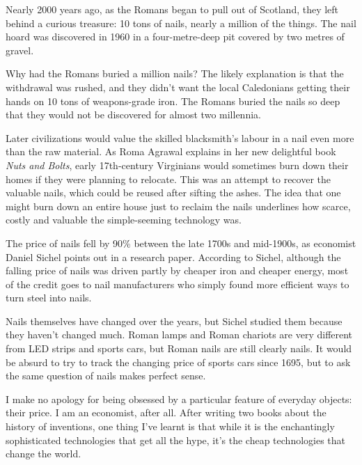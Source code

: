 \documentclass[12pt,a4paper]{article}
\begin{document}
\begin{reading}

\begin{examtext}
Nearly 2000 years ago, as the Romans began to pull out of Scotland, they left behind a curious treasure: 10 tons of nails, nearly a million of the things. The nail hoard was discovered in 1960 in a four-metre-deep pit covered by two metres of gravel.

Why had the Romans buried a million nails? The likely explanation is that the withdrawal was rushed, and they didn't want the local Caledonians getting their hands on 10 tons of weapons-grade iron. The Romans buried the nails so deep that they would not be discovered for almost two millennia.

Later civilizations would value the skilled blacksmith's labour in a nail even more than the raw material. As Roma Agrawal explains in her new delightful book \textit{Nuts and Bolts}, early 17th-century Virginians would sometimes burn down their homes if they were planning to relocate. This was an attempt to recover the valuable nails, which could be reused after sifting the ashes. The idea that one might burn down an entire house just to reclaim the nails underlines how scarce, costly and valuable the simple-seeming technology was.

The price of nails fell by 90\% between the late 1700s and mid-1900s, as economist Daniel Sichel points out in a research paper. According to Sichel, although the falling price of nails was driven partly by cheaper iron and cheaper energy, most of the credit goes to nail manufacturers who simply found more efficient ways to turn steel into nails.

Nails themselves have changed over the years, but Sichel studied them because they haven't changed much. Roman lamps and Roman chariots are very different from LED strips and sports cars, but Roman nails are still clearly nails. It would be absurd to try to track the changing price of sports cars since 1695, but to ask the same question of nails makes perfect sense.

I make no apology for being obsessed by a particular feature of everyday objects: their price. I am an economist, after all. After writing two books about the history of inventions, one thing I've learnt is that while it is the enchantingly sophisticated technologies that get all the hype, it's the cheap technologies that change the world.


\end{examtext}
\end{reading}
\end{document}
